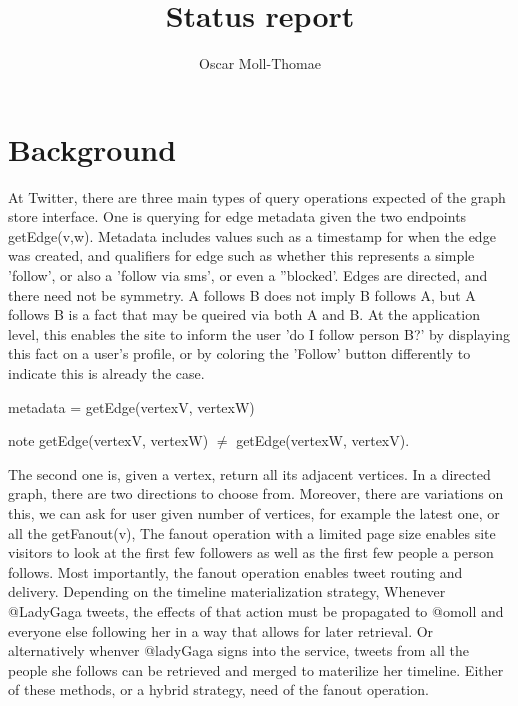 \documentclass[11pt]{article}
\author{Oscar Moll-Thomae}
\title{Status report}
\begin{document}
\maketitle

\newcommand{\code}{\ttfamily}

\newcommand{\edgeq}{{\code getEdge()}}
\newcommand{\fanoutq}[1][]{{\code getFanout(}~#1~{\code )}}
\newcommand{\intersectq}{{\code getIntersection()}}
\newcommand{\randomwalk}{{\code randomWalk()}}



\section{Background}

At Twitter, there are three main types of query operations expected of the graph store interface. One is querying for edge metadata given the two endpoints {\code getEdge(v,w)}. Metadata includes values such as a timestamp for when the edge was created, and qualifiers for edge such as whether this represents a simple 'follow', or also a  'follow via sms', or even a ''blocked'. Edges are directed, and there need not be symmetry.  A follows B does not imply B follows A, but A follows B is a fact that may be queired via both A and B. At the application level, this enables the site to inform the user  'do I follow person B?' by displaying this fact on a user's profile, or by coloring the 'Follow' button differently to indicate this is already the case.   

{\code metadata = getEdge(vertexV, vertexW)}

note getEdge(vertexV, vertexW) $\neq$ getEdge(vertexW, vertexV).


The second one is, given a vertex, return all its adjacent vertices. In a directed graph, there are two directions
to choose from. Moreover, there are variations on this, we can ask for user given number of vertices, for example the latest one, or all the   {\code getFanout(v)}, The fanout operation with a limited page size enables site visitors to look at the first few followers as well as the first few people a person follows.   Most importantly, the fanout operation enables tweet routing and delivery. Depending on the timeline materialization strategy, Whenever @LadyGaga tweets, the effects of that action must be propagated to @omoll and  everyone else following her in a way that allows for later retrieval.  Or alternatively whenver @ladyGaga signs into the service, tweets from all the people she follows can be retrieved and merged to materilize her timeline. Either of these methods, or a hybrid strategy, need of the fanout operation.
\end{document}
